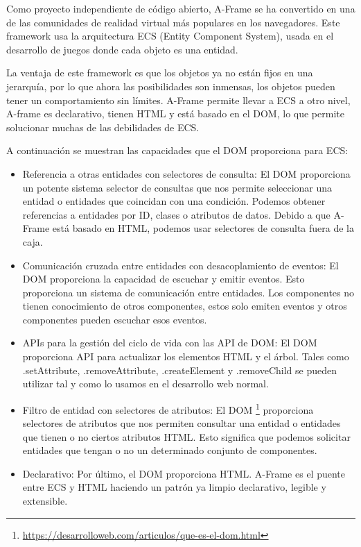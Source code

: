 \documentclass[a4paper, 12pt]{book}
\begin{document}
Como proyecto independiente de código abierto, A-Frame se ha convertido en una de las comunidades de realidad virtual más populares en los navegadores.
Este framework usa la arquitectura ECS (Entity Component System), usada en el desarrollo de juegos donde cada objeto es una entidad.

La ventaja de este framework es que los objetos ya no están fijos en una jerarquía, por lo que ahora las posibilidades son inmensas, los objetos pueden tener un comportamiento sin límites. A-Frame permite llevar a ECS a otro nivel, A-frame es declarativo, tienen HTML y está basado en el DOM, lo que permite solucionar muchas de las debilidades de ECS.

A continuación se muestran las capacidades que el DOM proporciona para ECS:
\begin{itemize}
    \item Referencia a otras entidades con selectores de consulta: El DOM proporciona un potente sistema selector de consultas que nos permite seleccionar una entidad o entidades que coincidan con una condición. Podemos obtener referencias a entidades por ID, clases o atributos de datos. Debido a que A-Frame está basado en HTML, podemos usar selectores de consulta fuera de la caja.
    
    \newpage
    \item Comunicación cruzada entre entidades con desacoplamiento de eventos: El DOM proporciona la capacidad de escuchar y emitir eventos. Esto proporciona un sistema de comunicación entre entidades. Los componentes no tienen conocimiento de otros componentes, estos solo emiten eventos y otros componentes pueden escuchar esos eventos.

    \item APIs para la gestión del ciclo de vida con las API de DOM: El DOM proporciona API para actualizar los elementos HTML y el árbol. Tales como .setAttribute, .removeAttribute, .createElement y .removeChild se pueden utilizar tal y como lo usamos en el desarrollo web normal.
   
    \item Filtro de entidad con selectores de atributos: El DOM \footnote{\url{https://desarrolloweb.com/articulos/que-es-el-dom.html}} proporciona selectores de atributos que nos permiten consultar una entidad o entidades que tienen o no ciertos atributos HTML. Esto significa que podemos solicitar entidades que tengan o no un determinado conjunto de componentes.
    
    \item Declarativo: Por último, el DOM proporciona HTML. A-Frame es el puente entre ECS y HTML haciendo un patrón ya limpio declarativo, legible y extensible.

\end{itemize}
\end{document}
